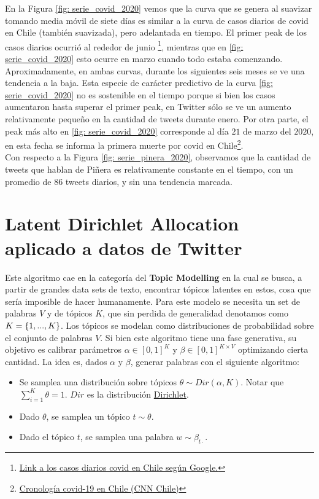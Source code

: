 \documentclass{article}
\begin{document}
En la Figura \ref{fig: serie_covid_2020} vemos que la curva que se genera al suavizar tomando media móvil de siete días es similar a la curva de casos diarios de covid en Chile (también suavizada), pero adelantada en tiempo. El primer peak de los casos diarios ocurrió al rededor de junio \footnote{\href{https://www.google.com/search?client=firefox-b-d&q=covid+chile}{Link a los casos diarios covid en Chile según Google.}}, mientras que en \ref{fig: serie_covid_2020} esto ocurre en marzo cuando todo estaba comenzando. Aproximadamente, en ambas curvas, durante los siguientes seis meses se ve una tendencia a la baja. Esta especie de carácter predictivo de la curva \ref{fig: serie_covid_2020} no es sostenible en el tiempo porque si bien los casos aumentaron hasta superar el primer peak, en Twitter sólo se ve un aumento relativamente pequeño en la cantidad de tweets durante enero. Por otra parte, el peak más alto en \ref{fig: serie_covid_2020} corresponde al día $21$ de marzo del $2020$, en esta fecha se informa la primera muerte por covid en Chile\footnote{\href{https://www.cnnchile.com/coronavirus/hitos-claves-covid-19-chile-mundo-cronologia_20200505/}{Cronología covid-19 en Chile (CNN Chile)}}.\\

Con respecto a la Figura \ref{fig: serie_pinera_2020}, observamos que la cantidad de tweets que hablan de Piñera es relativamente constante en el tiempo, con un promedio de $86$ tweets diarios, y sin una tendencia marcada. 


\section{Latent Dirichlet Allocation aplicado a datos de Twitter}
	Este algoritmo cae en la categoría del \textbf{Topic Modelling} en la cual se busca, a partir de grandes data sets de texto, encontrar tópicos latentes en estos, cosa que sería imposible de hacer humanamente. Para este modelo se necesita un set de palabras $V$ y de tópicos $K$, que sin perdida de generalidad denotamos como $K=\left\{1,...,K\right\}$. Los tópicos se modelan como distribuciones de probabilidad sobre el conjunto de palabras $V$. Si bien este algoritmo tiene una fase generativa, su objetivo es calibrar parámetros $\alpha\in [0,1]^{K}$ y $\beta\in[0,1]^{K\times V}$ optimizando cierta cantidad. La idea es, dados $\alpha$ y $\beta$, generar palabras con el siguiente algoritmo:
	
	\begin{itemize}
		\item Se samplea una distribución sobre tópicos $\theta\sim Dir(\alpha, K)$. Notar que $\sum_{i=1}^K \theta = 1$. $Dir$ es la distribución \href{https://en.wikipedia.org/wiki/Dirichlet_distribution}{Dirichlet}.
		\item Dado $\theta$, se samplea un tópico $t\sim\theta$.
		\item Dado el tópico $t$, se samplea una palabra $w\sim\beta_{t\cdot}$.
	\end{itemize}
	
\end{document}
